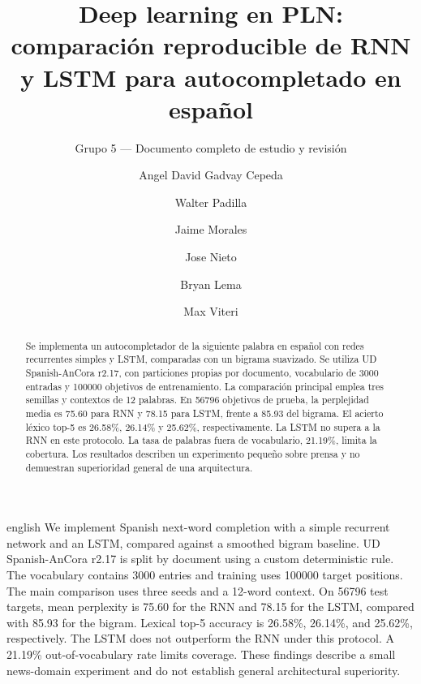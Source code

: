 \documentclass[sigconf,nonacm,language=english,language=spanish]{acmart}
\title{Deep learning en PLN: comparación reproducible de RNN y LSTM para autocompletado en español}
\subtitle{Grupo 5 --- Documento completo de estudio y revisión}
\author{Angel David Gadvay Cepeda}
\author{Walter Padilla}
\author{Jaime Morales}
\author{Jose Nieto}
\author{Bryan Lema}
\author{Max Viteri}
\affiliation{%
  \institution{Escuela Superior Politécnica de Chimborazo}
  \city{Riobamba}
  \country{Ecuador}}
\begin{document}
\begin{abstract}
Se implementa un autocompletador de la siguiente palabra en español con
redes recurrentes simples y LSTM, comparadas con un bigrama suavizado.
Se utiliza UD Spanish-AnCora r2.17, con particiones propias por documento,
vocabulario de 3000 entradas y 100000 objetivos de entrenamiento.
La comparación principal emplea tres semillas y contextos de 12 palabras.
En 56796 objetivos de prueba, la perplejidad media es 75.60 para RNN y
78.15 para LSTM, frente a 85.93 del bigrama. El acierto léxico top-5 es
26.58\%, 26.14\% y 25.62\%, respectivamente. La LSTM no supera a la RNN
en este protocolo. La tasa de palabras fuera de vocabulario, 21.19\%,
limita la cobertura. Los resultados describen un experimento pequeño
sobre prensa y no demuestran superioridad general de una arquitectura.
\end{abstract}
\begin{translatedabstract}{english}
We implement Spanish next-word completion with a simple recurrent network
and an LSTM, compared against a smoothed bigram baseline. UD Spanish-AnCora
r2.17 is split by document using a custom deterministic rule. The vocabulary
contains 3000 entries and training uses 100000 target positions. The main
comparison uses three seeds and a 12-word context. On 56796 test targets,
mean perplexity is 75.60 for the RNN and 78.15 for the LSTM, compared with
85.93 for the bigram. Lexical top-5 accuracy is 26.58\%, 26.14\%, and
25.62\%, respectively. The LSTM does not outperform the RNN under this
protocol. A 21.19\% out-of-vocabulary rate limits coverage. These findings
describe a small news-domain experiment and do not establish general
architectural superiority.
\end{translatedabstract}
\maketitle












\end{document}
